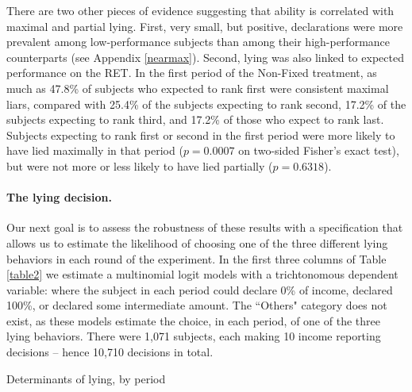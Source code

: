 \documentclass[12pt]{article}
\begin{document}
\par There are two other pieces of evidence suggesting that ability is correlated with maximal and partial lying. First, very small, but positive, declarations were more prevalent among low-performance subjects than among their high-performance counterparts (see Appendix \ref{nearmax}).  Second, lying was also linked to expected performance on the RET. In the first period of the Non-Fixed treatment, as much as 47.8\% of subjects who expected to rank first were consistent maximal liars, compared with 25.4\% of the subjects expecting to rank second, 17.2\% of the subjects expecting to rank third, and 17.2\% of those who expect to rank last.\footnotemark{} 
Subjects expecting to rank first or second in the first period were more likely to have lied maximally in that period ($p=0.0007$ on two-sided Fisher's exact test), but were not more or less likely to have lied partially ($p=0.6318$).\footnotemark{}
\label{stata:init_pred}

\paragraph{The lying decision.} Our next goal is to assess the robustness of these results with a specification that allows us to estimate the likelihood of choosing one of the three different lying behaviors in each round of the experiment. In the first three columns of Table \ref{table2} we estimate a multinomial logit models with a trichtonomous dependent variable: where the subject in each period could declare 0\% of income, declared 100\%, or declared some intermediate amount. The ``Others" category does not exist, as these models estimate the choice, in each period, of one of the three lying behaviors. There were 1,071 subjects, each making 10 income reporting decisions -- hence 10,710 decisions in total.

\begin{table}[ht]\scriptsize
\begin{center}



\end{center}
\caption{Determinants of lying, by period}
\label{table2}
\end{table}
\end{document}
